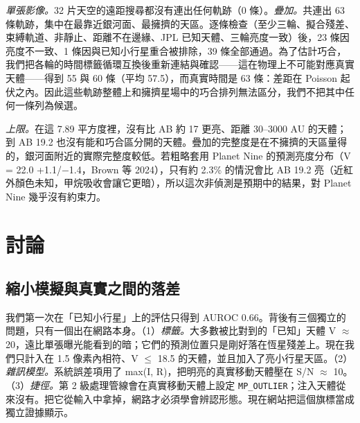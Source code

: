 \documentclass[twocolumn]{aastex631}
\begin{document}
\emph{單張影像。}32 片天空的遠距搜尋都沒有連出任何軌跡（0 條）。\emph{疊加。}共連出 63 條軌跡，集中在最靠近銀河面、最擁擠的天區。逐條檢查（至少三輪、擬合殘差、束縛軌道、非靜止、距離不在邊緣、JPL 已知天體、三輪亮度一致）後，23 條因亮度不一致、1 條因與已知小行星重合被排除，39 條全部通過。為了估計巧合，我們把各輪的時間標籤循環互換後重新連結與確認------這在物理上不可能對應真實天體------得到 55 與 60 條（平均 57.5），而真實時間是 63 條：差距在 Poisson 起伏之內。因此這些軌跡整體上和擁擠星場中的巧合排列無法區分，我們不把其中任何一條列為候選。

\emph{上限。}在這 7.89 平方度裡，沒有比 AB 約 17 更亮、距離 30--3000 AU 的天體；到 AB 19.2 也沒有能和巧合區分開的天體。疊加的完整度是在不擁擠的天區量得的，銀河面附近的實際完整度較低。若粗略套用 Planet Nine 的預測亮度分布（V = 22.0 +1.1/$-$1.4，Brown 等 2024），只有約 2.3\% 的情況會比 AB 19.2 亮（近紅外顏色未知，甲烷吸收會讓它更暗），所以這次非偵測是預期中的結果，對 Planet Nine 幾乎沒有約束力。

\section{討論}
\label{sec:discussion}
\subsection{縮小模擬與真實之間的落差}
我們第一次在「已知小行星」上的評估只得到 AUROC 0.66。背後有三個獨立的問題，只有一個出在網路本身。（1）\emph{標籤。}大多數被比對到的「已知」天體 V $\approx$ 20，遠比單張曝光能看到的暗；它們的預測位置只是剛好落在恆星殘差上。現在我們只計入在 1.5 像素內相符、V $\le$ 18.5 的天體，並且加入了亮小行星天區。（2）\emph{雜訊模型。}系統誤差項用了 max(I, R)，把明亮的真實移動天體壓在 S/N $\approx$ 10。（3）\emph{捷徑。}第 2 級處理管線會在真實移動天體上設定 \texttt{MP\_OUTLIER}；注入天體從來沒有。把它從輸入中拿掉，網路才必須學會辨認形態。現在網站把這個旗標當成獨立證據顯示。
\end{document}
